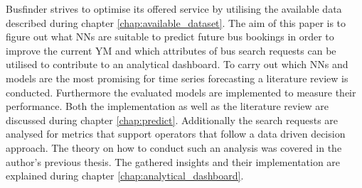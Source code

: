 \newline
\newline
Busfinder strives to optimise its offered service by utilising the available data described during chapter \ref{chap:available_dataset}. The aim of this paper is to figure out what NNs are suitable to predict future bus bookings in order to improve the current YM and which attributes of bus search requests can be utilised to contribute to an analytical dashboard. To carry out which NNs and models are the most promising for time series forecasting a literature review is conducted. Furthermore the evaluated models are implemented to measure their performance. Both the implementation as well as the literature review are discussed during chapter \ref{chap:predict}. Additionally the search requests are analysed for metrics that support operators that follow a data driven decision approach. The theory on how to conduct such an analysis was covered in the author's previous thesis. The gathered insights and their implementation are explained during chapter \ref{chap:analytical_dashboard}.



